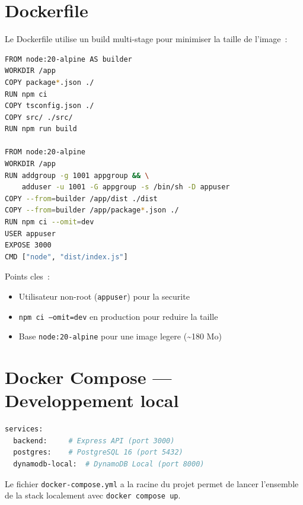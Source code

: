 \section{Dockerfile}

Le Dockerfile utilise un build multi-stage pour minimiser la taille de l'image~:

\begin{lstlisting}[language=bash,caption={Dockerfile multi-stage}]
FROM node:20-alpine AS builder
WORKDIR /app
COPY package*.json ./
RUN npm ci
COPY tsconfig.json ./
COPY src/ ./src/
RUN npm run build

FROM node:20-alpine
WORKDIR /app
RUN addgroup -g 1001 appgroup && \
    adduser -u 1001 -G appgroup -s /bin/sh -D appuser
COPY --from=builder /app/dist ./dist
COPY --from=builder /app/package*.json ./
RUN npm ci --omit=dev
USER appuser
EXPOSE 3000
CMD ["node", "dist/index.js"]
\end{lstlisting}

Points cles~:
\begin{itemize}
    \item Utilisateur non-root (\texttt{appuser}) pour la securite
    \item \texttt{npm ci --omit=dev} en production pour reduire la taille
    \item Base \texttt{node:20-alpine} pour une image legere (\~{}180 Mo)
\end{itemize}

\section{Docker Compose --- Developpement local}

\begin{lstlisting}[language=bash,caption={Services docker-compose}]
services:
  backend:     # Express API (port 3000)
  postgres:    # PostgreSQL 16 (port 5432)
  dynamodb-local:  # DynamoDB Local (port 8000)
\end{lstlisting}

Le fichier \texttt{docker-compose.yml} a la racine du projet permet de lancer
l'ensemble de la stack localement avec \texttt{docker compose up}.
